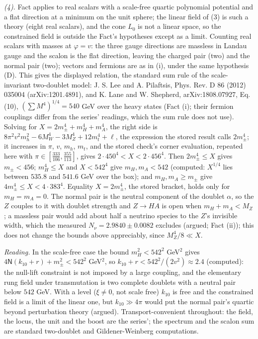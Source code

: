 \emph{(4).} Fact  applies to real scalars with a scale-free quartic polynomial potential and a flat direction at a minimum on the unit sphere; the linear field of (3) is such a theory (eight real scalars), and the cone $L_{0}$ is not a linear space, so the constrained field is outside the Fact's hypotheses except as a limit. Counting real scalars with masses at $\varphi = v$: the three gauge directions are massless in Landau gauge and the scalon is the flat direction, leaving the charged pair (two) and the normal pair (two); vectors and fermions are as in (i), under the same hypothesis (D). This gives the displayed relation, the standard sum rule of the scale-invariant two-doublet model: J. S. Lee and A. Pilaftsis, Phys. Rev. D 86 (2012) 035004 (arXiv:1201.4891), and K. Lane and W. Shepherd, arXiv:1808.07927, Eq. (10), $(\sum M^{4})^{1/4} = 540$ GeV over the heavy states (Fact (i); their fermion couplings differ from the series' readings, which the sum rule does not use). Solving for $X = 2m_{\pm}^{4} + m_{H}^{4} + m_{A}^{4}$, the right side is $8\pi^{2}v^{2}m_{h}^{2} - 6M_{W}^{4} - 3M_{Z}^{4} + 12m_{t}^{4} + \ell$, the expression the stored result calls $2m_{\pm}^{4}$; it increases in $\pi$, $v$, $m_{h}$, $m_{t}$, and the stored check's corner evaluation, repeated here with $\pi \in [\tfrac{333}{106}, \tfrac{355}{113}]$, gives $2 \cdot 450^{4} < X < 2 \cdot 456^{4}$. Then $2m_{\pm}^{4} \le X$ gives $m_{\pm} < 456$; $m_{H}^{4} \le X$ and $X < 542^{4}$ give $m_{H}, m_{A} < 542$ (computed: $X^{1/4}$ lies between $535.8$ and $541.6$ GeV over the box); and $m_{H}, m_{A} \ge m_{\pm}$ give $4m_{\pm}^{4} \le X < 4 \cdot 383^{4}$. Equality $X = 2m_{\pm}^{4}$, the stored bracket, holds only for $m_{H} = m_{A} = 0$. The normal pair is the neutral component of the doublet $\alpha$, so the $Z$ couples to it with doublet strength and $Z \to HA$ is open when $m_{H} + m_{A} < M_{Z}$; a massless pair would add about half a neutrino species to the $Z$'s invisible width, which the measured $N_{\nu} = 2.9840 \pm 0.0082$ excludes (argued; Fact (ii)); this does not change the bounds above appreciably, since $M_{Z}^{4}/8 \ll X$.

\emph{Reading.} In the scale-free case the bound $m_{H}^{2} < 542^{2}$ GeV$^{2}$ gives $4\mathsf{N}(k_{10} + r) + m_{\pm}^{2} < 542^{2}$ GeV$^{2}$, so $k_{10} + r < 542^{2}/(2v^{2}) \approx 2.4$ (computed): the null-lift constraint is not imposed by a large coupling, and the elementary rung field under transmutation is two complete doublets with a neutral pair below $542$ GeV. With a level ($\xi \ne 0$, not scale free) $k_{10}$ is free and the constrained field is a limit of the linear one, but $k_{10} \gg 4\pi$ would put the normal pair's quartic beyond perturbation theory (argued). Transport-convenient throughout: the field, the locus, the unit and the boost are the series'; the spectrum and the scalon sum are standard two-doublet and Gildener-Weinberg computations.

